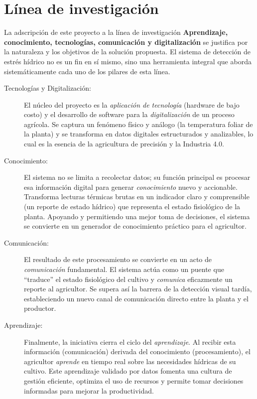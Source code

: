 \section{Línea de investigación}
\label{subsec:just_linea_inv}

La adscripción de este proyecto a la línea de investigación \textbf{Aprendizaje, conocimiento, tecnologías, comunicación y digitalización} se justifica por la naturaleza y los objetivos de la solución propuesta. El sistema de detección de estrés hídrico no es un fin en sí mismo, sino una herramienta integral que aborda sistemáticamente cada uno de los pilares de esta línea.

\begin{description}
    \item [Tecnologías y Digitalización:] 
    El núcleo del proyecto es la \emph{aplicación de tecnología} (hardware de bajo costo) y el desarrollo de software para la \emph{digitalización} de un proceso agrícola. Se captura un fenómeno físico y análogo (la temperatura foliar de la planta) y se transforma en datos digitales estructurados y analizables, lo cual es la esencia de la agricultura de precisión y la Industria 4.0.

    \item [Conocimiento:] 
    El sistema no se limita a recolectar datos; su función principal es procesar esa información digital para generar \emph{conocimiento} nuevo y accionable. Transforma lecturas térmicas brutas en un indicador claro y comprensible (un reporte de estado hídrico) que representa el estado fisiológico de la planta. Apoyando y permitiendo una mejor toma de decisiones, el sistema se convierte en un generador de conocimiento práctico para el agricultor.

    \item [Comunicación:] 
    El resultado de este procesamiento se convierte en un acto de \emph{comunicación} fundamental. El sistema actúa como un puente que ``traduce'' el estado fisiológico del cultivo y \emph{comunica} eficazmente un reporte al agricultor. Se supera así la barrera de la detección visual tardía, estableciendo un nuevo canal de comunicación directo entre la planta y el productor.

    \item [Aprendizaje:] 
    Finalmente, la iniciativa cierra el ciclo del \emph{aprendizaje}. Al recibir esta información (comunicación) derivada del conocimiento (procesamiento), el agricultor \emph{aprende} en tiempo real sobre las necesidades hídricas de su cultivo. Este aprendizaje validado por datos fomenta una cultura de gestión eficiente, optimiza el uso de recursos y permite tomar decisiones informadas para mejorar la productividad.
\end{description}


